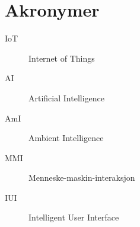 \chapter{Akronymer}
\begin{description}
\item[IoT] Internet of Things
\item[AI] Artificial Intelligence
\item[AmI] Ambient Intelligence
\item[MMI] Menneske-maskin-interaksjon
\item[IUI] Intelligent User Interface
\end{description}